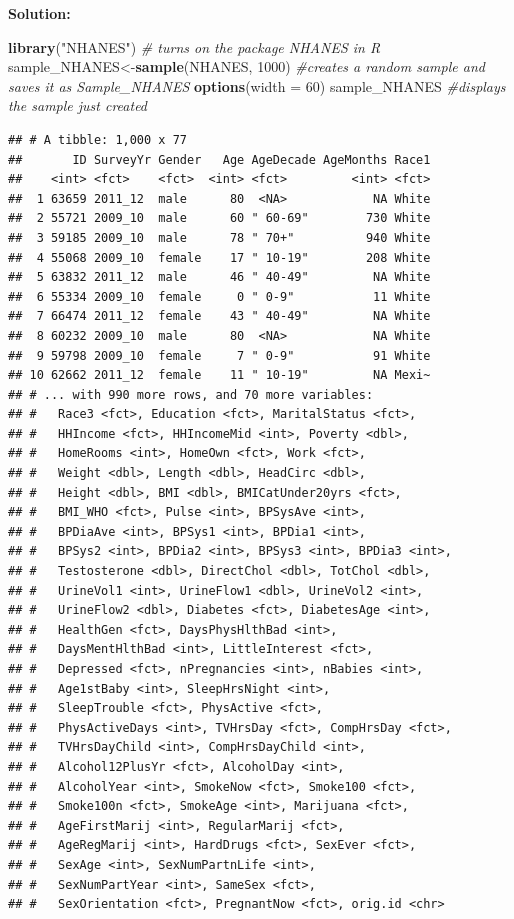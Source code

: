 \documentclass[
]{book}
\newenvironment{Shaded}{\begin{snugshade}}{\end{snugshade}}
\newcommand{\CommentTok}[1]{\textcolor[rgb]{0.56,0.35,0.01}{\textit{#1}}}
\newcommand{\DataTypeTok}[1]{\textcolor[rgb]{0.13,0.29,0.53}{#1}}
\newcommand{\DecValTok}[1]{\textcolor[rgb]{0.00,0.00,0.81}{#1}}
\newcommand{\KeywordTok}[1]{\textcolor[rgb]{0.13,0.29,0.53}{\textbf{#1}}}
\newcommand{\NormalTok}[1]{#1}
\newcommand{\StringTok}[1]{\textcolor[rgb]{0.31,0.60,0.02}{#1}}
\begin{document}
\textbf{Solution:}

\begin{Shaded}
\begin{Highlighting}[]
\KeywordTok{library}\NormalTok{(}\StringTok{"NHANES"}\NormalTok{) }\CommentTok{# turns on the package NHANES in R}
\NormalTok{sample_NHANES<-}\KeywordTok{sample}\NormalTok{(NHANES, }\DecValTok{1000}\NormalTok{) }
\CommentTok{#creates a random sample and saves it as Sample_NHANES}
\KeywordTok{options}\NormalTok{(}\DataTypeTok{width =} \DecValTok{60}\NormalTok{)}
\NormalTok{sample_NHANES }\CommentTok{#displays the sample just created}
\end{Highlighting}
\end{Shaded}

\begin{verbatim}
## # A tibble: 1,000 x 77
##       ID SurveyYr Gender   Age AgeDecade AgeMonths Race1
##    <int> <fct>    <fct>  <int> <fct>         <int> <fct>
##  1 63659 2011_12  male      80  <NA>            NA White
##  2 55721 2009_10  male      60 " 60-69"        730 White
##  3 59185 2009_10  male      78 " 70+"          940 White
##  4 55068 2009_10  female    17 " 10-19"        208 White
##  5 63832 2011_12  male      46 " 40-49"         NA White
##  6 55334 2009_10  female     0 " 0-9"           11 White
##  7 66474 2011_12  female    43 " 40-49"         NA White
##  8 60232 2009_10  male      80  <NA>            NA White
##  9 59798 2009_10  female     7 " 0-9"           91 White
## 10 62662 2011_12  female    11 " 10-19"         NA Mexi~
## # ... with 990 more rows, and 70 more variables:
## #   Race3 <fct>, Education <fct>, MaritalStatus <fct>,
## #   HHIncome <fct>, HHIncomeMid <int>, Poverty <dbl>,
## #   HomeRooms <int>, HomeOwn <fct>, Work <fct>,
## #   Weight <dbl>, Length <dbl>, HeadCirc <dbl>,
## #   Height <dbl>, BMI <dbl>, BMICatUnder20yrs <fct>,
## #   BMI_WHO <fct>, Pulse <int>, BPSysAve <int>,
## #   BPDiaAve <int>, BPSys1 <int>, BPDia1 <int>,
## #   BPSys2 <int>, BPDia2 <int>, BPSys3 <int>, BPDia3 <int>,
## #   Testosterone <dbl>, DirectChol <dbl>, TotChol <dbl>,
## #   UrineVol1 <int>, UrineFlow1 <dbl>, UrineVol2 <int>,
## #   UrineFlow2 <dbl>, Diabetes <fct>, DiabetesAge <int>,
## #   HealthGen <fct>, DaysPhysHlthBad <int>,
## #   DaysMentHlthBad <int>, LittleInterest <fct>,
## #   Depressed <fct>, nPregnancies <int>, nBabies <int>,
## #   Age1stBaby <int>, SleepHrsNight <int>,
## #   SleepTrouble <fct>, PhysActive <fct>,
## #   PhysActiveDays <int>, TVHrsDay <fct>, CompHrsDay <fct>,
## #   TVHrsDayChild <int>, CompHrsDayChild <int>,
## #   Alcohol12PlusYr <fct>, AlcoholDay <int>,
## #   AlcoholYear <int>, SmokeNow <fct>, Smoke100 <fct>,
## #   Smoke100n <fct>, SmokeAge <int>, Marijuana <fct>,
## #   AgeFirstMarij <int>, RegularMarij <fct>,
## #   AgeRegMarij <int>, HardDrugs <fct>, SexEver <fct>,
## #   SexAge <int>, SexNumPartnLife <int>,
## #   SexNumPartYear <int>, SameSex <fct>,
## #   SexOrientation <fct>, PregnantNow <fct>, orig.id <chr>
\end{verbatim}
\end{document}
